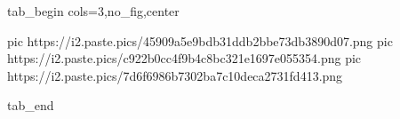  
 
 
 
 


\ifcmt
  tab_begin cols=3,no_fig,center

     pic https://i2.paste.pics/45909a5e9bdb31ddb2bbe73db3890d07.png
		 pic https://i2.paste.pics/c922b0cc4f9b4c8bc321e1697e055354.png
		 pic https://i2.paste.pics/7d6f6986b7302ba7c10deca2731fd413.png

  tab_end
\fi
